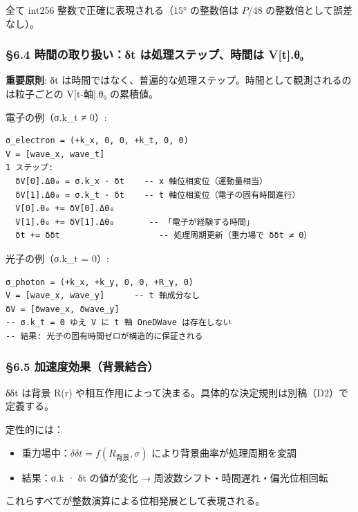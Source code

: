 \documentclass[a4paper,11pt]{ltjsarticle}
\providecommand{\tightlist}{\setlength{\itemsep}{0pt}\setlength{\parskip}{0pt}}
\begin{document}
全て int256 整数で正確に表現される（\(15°\) の整数倍は \(P/48\)
の整数倍として誤差なし）。

\subsubsection{§6.4 時間の取り扱い：δt は処理ステップ、時間は
V{[}t{]}.θ₀}\label{ux6642ux9593ux306eux53d6ux308aux6271ux3044ux3b4t-ux306fux51e6ux7406ux30b9ux30c6ux30c3ux30d7ux6642ux9593ux306f-vt.ux3b8ux2080}

\textbf{重要原則}: δt
は時間ではなく、普遍的な処理ステップ。時間として観測されるのは粒子ごとの
V{[}t-軸{]}.θ₀ の累積値。

電子の例（σ.k\_t ≠ 0）:

\begin{verbatim}
σ_electron = (+k_x, 0, 0, +k_t, 0, 0)
V = [wave_x, wave_t]
1 ステップ:
  δV[0].Δθ₀ = σ.k_x · δt    -- x 軸位相変位（運動量相当）
  δV[1].Δθ₀ = σ.k_t · δt    -- t 軸位相変位（電子の固有時間進行）
  V[0].θ₀ += δV[0].Δθ₀
  V[1].θ₀ += δV[1].Δθ₀       -- 「電子が経験する時間」
  δt += δδt                    -- 処理周期更新（重力場で δδt ≠ 0）
\end{verbatim}

光子の例（σ.k\_t = 0）:

\begin{verbatim}
σ_photon = (+k_x, +k_y, 0, 0, +R_γ, 0)
V = [wave_x, wave_y]      -- t 軸成分なし
δV = [δwave_x, δwave_y]
-- σ.k_t = 0 ゆえ V に t 軸 OneDWave は存在しない
-- 結果: 光子の固有時間ゼロが構造的に保証される
\end{verbatim}

\subsubsection{§6.5
加速度効果（背景結合）}\label{ux52a0ux901fux5ea6ux52b9ux679cux80ccux666fux7d50ux5408}

δδt は背景 R(r)
や相互作用によって決まる。具体的な決定規則は別稿（D2）で定義する。

定性的には：

\begin{itemize}
\tightlist
\item
  重力場中：\(\delta\delta t = f(R_{\text{背景}}, \sigma)\)
  により背景曲率が処理周期を変調
\item
  結果：σ.k · δt の値が変化 → 周波数シフト・時間遅れ・偏光位相回転
\end{itemize}

これらすべてが整数演算による位相発展として表現される。
\end{document}
